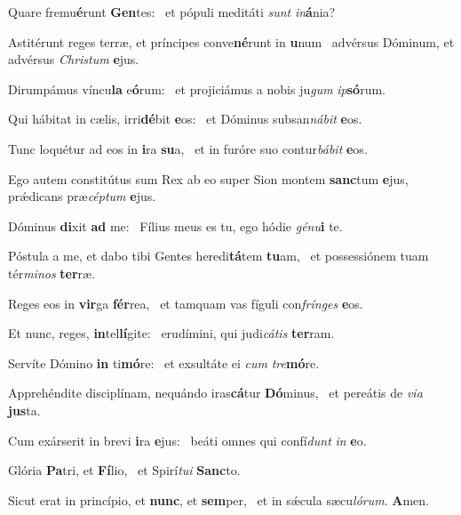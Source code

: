 \item Quare fremu\textbf{é}runt \textbf{Gen}tes:~\psstar{} et pópuli meditáti \textit{sunt} \textit{in}\textbf{á}nia?
\item Astitérunt reges terræ, et príncipes conve\textbf{né}runt in \textbf{u}num~\psstar{} advérsus Dóminum, et advérsus \textit{Chris}\textit{tum} \textbf{e}jus.
\item Dirumpámus víncu\textbf{la} e\textbf{ó}rum:~\psstar{} et projiciámus a nobis ju\textit{gum} \textit{ip}\textbf{só}rum.
\item Qui hábitat in cælis, irri\textbf{dé}bit \textbf{e}os:~\psstar{} et Dóminus subsan\textit{ná}\textit{bit} \textbf{e}os.
\item Tunc loquétur ad eos in \textbf{i}ra \textbf{su}a,~\psstar{} et in furóre suo contur\textit{bá}\textit{bit} \textbf{e}os.
\item Ego autem constitútus sum Rex ab eo super Sion montem \textbf{sanc}tum \textbf{e}jus,~\psstar{} prǽdicans præ\textit{cép}\textit{tum} \textbf{e}jus.
\item Dóminus \textbf{di}xit \textbf{ad} me:~\psstar{} Fílius meus es tu, ego hódie \textit{gé}\textit{nu}\textbf{i} te.
\item Póstula a me, et dabo tibi Gentes heredi\textbf{tá}tem \textbf{tu}am,~\psstar{} et possessiónem tuam tér\textit{mi}\textit{nos} \textbf{ter}ræ.
\item Reges eos in \textbf{vir}ga \textbf{fér}rea,~\psstar{} et tamquam vas fíguli con\textit{frín}\textit{ges} \textbf{e}os.
\item Et nunc, reges, \textbf{in}tel\textbf{lí}gite:~\psstar{} erudímini, qui judi\textit{cá}\textit{tis} \textbf{ter}ram.
\item Servíte Dómino \textbf{in} ti\textbf{mó}re:~\psstar{} et exsultáte ei \textit{cum} \textit{tre}\textbf{mó}re.
\item Apprehéndite disciplínam, nequándo iras\textbf{cá}tur \textbf{Dó}minus,~\psstar{} et pereátis de \textit{vi}\textit{a} \textbf{jus}ta.
\item Cum exárserit in brevi \textbf{i}ra \textbf{e}jus:~\psstar{} beáti omnes qui confí\textit{dunt} \textit{in} \textbf{e}o.
\item Glória \textbf{Pa}tri, et \textbf{Fí}lio,~\psstar{} et Spirí\textit{tu}\textit{i} \textbf{Sanc}to.
\item Sicut erat in princípio, et \textbf{nunc}, et \textbf{sem}per,~\psstar{} et in sǽcula sæcu\textit{ló}\textit{rum}. \textbf{A}men.
